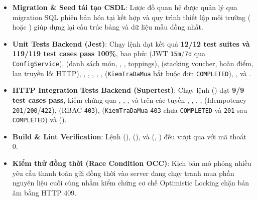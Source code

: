 \documentclass[12pt,a4paper]{report}
\begin{document}
\begin{itemize}[leftmargin=*]
\item \textbf{Migration \& Seed tái tạo CSDL}: Lược đồ quan hệ được quản lý qua migration SQL phiên bản hóa tại  kết hợp  và quy trình thiết lập môi trường ( hoặc ) giúp dựng lại cấu trúc bảng và dữ liệu mẫu đồng nhất.
\item \textbf{Unit Tests Backend (Jest)}: Chạy lệnh  đạt kết quả \textbf{12/12 test suites và 119/119 test cases pass 100\%}, bao phủ:  (JWT \texttt{15m}/\texttt{7d} qua \texttt{ConfigService}),  (danh sách món, , , toppings),  (stacking voucher, hoàn điểm, lan truyền lỗi HTTP), , , , , ,  (\texttt{KiemTraDaMua} bắt buộc đơn \texttt{COMPLETED}), ,  và .
\item \textbf{HTTP Integration Tests Backend (Supertest)}: Chạy lệnh  () đạt \textbf{9/9 test cases pass}, kiểm chứng qua , , ,  và  trên các tuyến , , , ,  (Idempotency \texttt{201}/\texttt{200}/\texttt{422}),  (RBAC \texttt{403}),  (\texttt{KiemTraDaMua} \texttt{403} chưa \texttt{COMPLETED} và \texttt{201} sau \texttt{COMPLETED}) và  ().
\item \textbf{Build \& Lint Verification}: Lệnh  (),  (),  và  (, ) đều vượt qua với mã thoát 0.
\item \textbf{Kiểm thử đồng thời (Race Condition OCC)}: Kịch bản  mô phỏng nhiều yêu cầu thanh toán gửi đồng thời vào server đang chạy tranh mua phần nguyên liệu cuối cùng nhằm kiểm chứng cơ chế Optimistic Locking chặn bán âm bằng HTTP 409.

\end{itemize}
\end{document}
